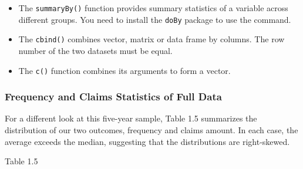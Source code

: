 \documentclass[]{book}
\theoremstyle{definition}
\theoremstyle{definition}
\theoremstyle{definition}
\theoremstyle{remark}
\begin{document}
\begin{itemize}
\item
  The \texttt{summaryBy()} function provides summary statistics of a
  variable across different groups. You need to install the
  \texttt{doBy} package to use the command.
\item
  The \texttt{cbind()} combines vector, matrix or data frame by columns.
  The row number of the two datasets must be equal.
\item
  The \texttt{c()} function combines its arguments to form a vector.
\end{itemize}

\subsubsection{Frequency and Claims Statistics of Full
Data}\label{frequency-and-claims-statistics-of-full-data}

For a different look at this five-year sample, Table 1.5 summarizes the
distribution of our two outcomes, frequency and claims amount. In each
case, the average exceeds the median, suggesting that the distributions
are right-skewed.

Table 1.5
\end{document}
